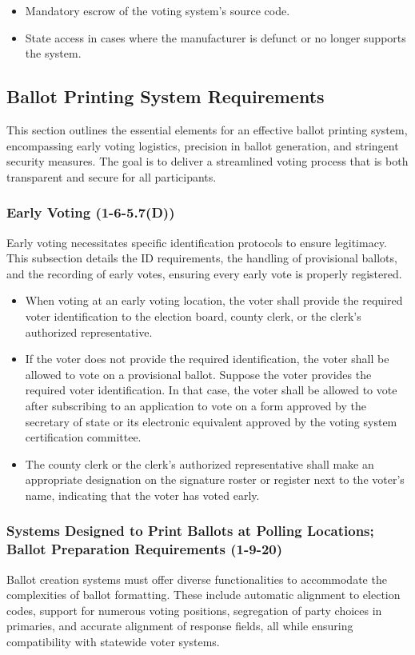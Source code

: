 \documentclass{article}
\begin{document}
\begin{itemize}
    \item Mandatory escrow of the voting system's source code.
    \item State access in cases where the manufacturer is defunct or no longer supports the system.
\end{itemize}

\subsection{Ballot Printing System Requirements}
This section outlines the essential elements for an effective ballot printing system, encompassing early voting logistics, precision in ballot generation, and stringent security measures. The goal is to deliver a streamlined voting process that is both transparent and secure for all participants.

\subsubsection{Early Voting (1-6-5.7(D))}
Early voting necessitates specific identification protocols to ensure legitimacy. This subsection details the ID requirements, the handling of provisional ballots, and the recording of early votes, ensuring every early vote is properly registered.

\begin{itemize}
    \item When voting at an early voting location, the voter shall provide the required voter identification to the election board, county clerk, or the clerk's authorized representative.
    \item If the voter does not provide the required identification, the voter shall be allowed to vote on a provisional ballot. Suppose the voter provides the required voter identification. In that case, the voter shall be allowed to vote after subscribing to an application to vote on a form approved by the secretary of state or its electronic equivalent approved by the voting system certification committee.
    \item The county clerk or the clerk's authorized representative shall make an appropriate designation on the signature roster or register next to the voter's name, indicating that the voter has voted early.
\end{itemize}

\subsubsection{Systems Designed to Print Ballots at Polling Locations; Ballot Preparation Requirements (1-9-20)}
Ballot creation systems must offer diverse functionalities to accommodate the complexities of ballot formatting. These include automatic alignment to election codes, support for numerous voting positions, segregation of party choices in primaries, and accurate alignment of response fields, all while ensuring compatibility with statewide voter systems.
\end{document}
